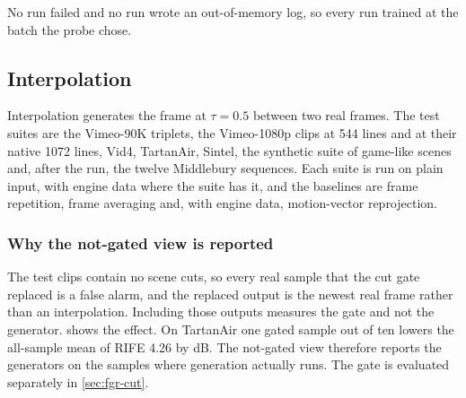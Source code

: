 No run failed and no run wrote an out-of-memory log, so every run trained at the batch the probe chose.

\subsection{Interpolation}\label{sec:fgr-interp}

Interpolation generates the frame at $\tau=0.5$ between two real frames. The test suites are the Vimeo-90K triplets, the Vimeo-1080p clips at 544 lines and at their native 1072 lines, Vid4, TartanAir, Sintel, the synthetic suite of game-like scenes and, after the run, the twelve Middlebury sequences. Each suite is run on plain input, with engine data where the suite has it, and the baselines are frame repetition, frame averaging and, with engine data, motion-vector reprojection.

\subsubsection{Why the not-gated view is reported}\label{sec:fgr-gate}

\Preliminary{} The test clips contain no scene cuts, so every real sample that the cut gate replaced is a false alarm, and the replaced output is the newest real frame rather than an interpolation. Including those outputs measures the gate and not the generator.  shows the effect. On TartanAir one gated sample out of ten lowers the all-sample mean of RIFE 4.26 by  dB. The not-gated view therefore reports the generators on the samples where generation actually runs. The gate is evaluated separately in \cref{sec:fgr-cut}.

